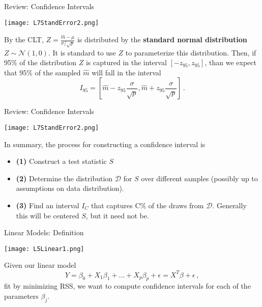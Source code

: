 \documentclass[10pt, table, dvipsnames,xcdraw, handout ]{beamer}
\begin{document}
\begin{frame}[fragile]{Review: Confidence Intervals}
  \begin{minipage}[t][0.5\textheight][t]{\textwidth}
	\centering \texttt{[image: L7StandError2.png]} 
  \end{minipage}
  \vfill
\begin{minipage}[t][0.5\textheight][t]{\textwidth}
By the CLT, $Z = \frac{\hat{m} - \mu}{\sigma/\sqrt{p}}$ is distributed by the \textbf{standard normal distribution} $Z\sim\mathcal{N}(1,0)$. It is standard to use $Z$ to parameterize this distribution. Then, if 95\% of the distribution $Z$ is captured in the interval $[-z_{95}, z_{95}]$, than we expect that 95\% of the sampled $\hat{m}$ will fall in the interval
$$
I_{95} = \left[
\hat{m} - z_{95}\frac{\sigma}{\sqrt{p}},\hat{m} + z_{95}\frac{\sigma}{\sqrt{p}}
\right]\,.
$$
\end{minipage}
\end{frame}



\begin{frame}[fragile]{Review: Confidence Intervals}
  \begin{minipage}[t][0.5\textheight][t]{\textwidth}
	\centering \texttt{[image: L7StandError2.png]} 
  \end{minipage}
  \vfill
\begin{minipage}[t][0.5\textheight][t]{\textwidth}
In summary, the process for constructing a confidence interval is
\begin{itemize}
\item \textbf{(1)} Construct a test statistic $S$
\item \textbf{(2)} Determine the distribution $\mathcal{D}$ for $S$ over different samples (possibly up to assumptions on data distribution).
\item \textbf{(3)} Find an interval $I_C$ that captures C\% of the draws from $\mathcal{D}$. Generally this will be centered $S$, but it need not be. 
\end{itemize}
\end{minipage}
\end{frame}





\begin{frame}[fragile]{Linear Models: Definition}
  \begin{minipage}[t][0.5\textheight][t]{\textwidth}
	\centering \texttt{[image: L5Linear1.png]} 
  \end{minipage}
  \vfill
\begin{minipage}[t][0.5\textheight][t]{\textwidth}
Given our linear model
$$
Y = \beta_0 + X_1\beta_1 +\ldots + X_p\beta_p + \epsilon = X^T\beta + \epsilon\,,
$$ 
fit by minimizing RSS, we want to compute confidence intervals for each of the parameters $\beta_j$. 
\end{minipage}
\end{frame}
\end{document}
